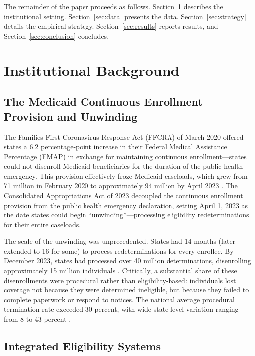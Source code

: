 \documentclass[12pt]{article}
\begin{document}
The remainder of the paper proceeds as follows. Section~\ref{sec:background} describes the institutional setting. Section~\ref{sec:data} presents the data. Section~\ref{sec:strategy} details the empirical strategy. Section~\ref{sec:results} reports results, and Section~\ref{sec:conclusion} concludes.


\section{Institutional Background}
\label{sec:background}

\subsection{The Medicaid Continuous Enrollment Provision and Unwinding}

The Families First Coronavirus Response Act (FFCRA) of March 2020 offered states a 6.2 percentage-point increase in their Federal Medical Assistance Percentage (FMAP) in exchange for maintaining continuous enrollment---states could not disenroll Medicaid beneficiaries for the duration of the public health emergency. This provision effectively froze Medicaid caseloads, which grew from 71 million in February 2020 to approximately 94 million by April 2023 \citep{kff2023unwinding}. The Consolidated Appropriations Act of 2023 decoupled the continuous enrollment provision from the public health emergency declaration, setting April 1, 2023 as the date states could begin ``unwinding''---processing eligibility redeterminations for their entire caseloads.

The scale of the unwinding was unprecedented. States had 14 months (later extended to 16 for some) to process redeterminations for every enrollee. By December 2023, states had processed over 40 million determinations, disenrolling approximately 15 million individuals \citep{cms2023}. Critically, a substantial share of these disenrollments were procedural rather than eligibility-based: individuals lost coverage not because they were determined ineligible, but because they failed to complete paperwork or respond to notices. The national average procedural termination rate exceeded 30 percent, with wide state-level variation ranging from 8 to 43 percent \citep{kff2023unwinding}.

\subsection{Integrated Eligibility Systems}
\end{document}
